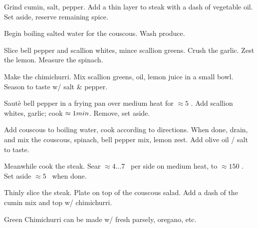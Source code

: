 \begin{preparation}
\item Grind cumin, salt, pepper.
	Add a thin layer to steak with a dash of vegetable oil.
	Set aside, reserve remaining spice.

\item Begin boiling salted water for the couscous.
	Wash produce.

\item Slice bell pepper and scallion whites, mince scallion greens.
	Crush the garlic.
	Zest the lemon.
	Measure the spinach.

\item Make the chimichurri.
	Mix scallion greens, oil, lemon juice in a small bowl.
	Season to taste w/ salt \& pepper.

\item Saut\`{e} bell pepper in a frying pan over medium heat for $\approx 5$ \minute.
	Add scallion whites, garlic; cook $\approx 1 \minute$.
	Remove, set aside.

\item Add couscous to boiling water, cook according to directions.
	When done, drain, and mix the couscous, spinach, bell pepper mix, lemon zest.
	Add olive oil / salt to taste.

\item Meanwhile cook the steak.
	Sear $\approx 4 \dots 7$ \minute~per side on medium heat, to $\approx 150$ \Fahrenheit.
	Set aside $\approx 5$ \minute~when done.

\item Thinly slice the steak.
	Plate on top of the couscous salad.
	Add a dash of the cumin mix and top w/ chimichurri.
\end{preparation}


\begin{variation}
\item Green Chimichurri can be made w/ fresh parsely, oregano, etc.
\end{variation}


\recipeend
